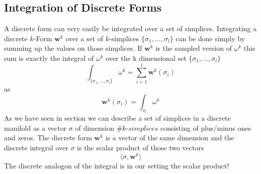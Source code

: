 
\subsection{Integration of Discrete Forms}
A discrete form can very easily be integrated over a set of simplices. Integrating a discrete $k$-Form $\textbf{w}^k$ over a set of $k$-simplices $\{\sigma_1,...,\sigma_l\}$ can be done simply by summing up the values on those simplices. If $\textbf{w}^k$ is the sampled version of $\omega^k$ this sum is exactly the integral of $\omega^k$  over the k dimensional set $\{\sigma_1,...,\sigma_l\}$
\[\int_{\{\sigma_1,...,\sigma_l\}} \omega^k = \sum_{i=1}^l \textbf{w}^k(\sigma_i)\]
as
\[\textbf{w}^k(\sigma_i) = \int_{\sigma_i} \omega^k\]
As we have seen in section  we can describe a set of simplices in a discrete manifold as a vector $\sigma$ of dimension $\# k$-$simplices$ consisting of plus/minus ones and zeros. The discrete form $\textbf{w}^k$ is a vector of the same dimension and the discrete integral over $\sigma$ is the scalar product of those two vectors
$$\langle \sigma , \textbf{w}^k \rangle$$
The discrete analogon of the integral is in our setting the scalar product!